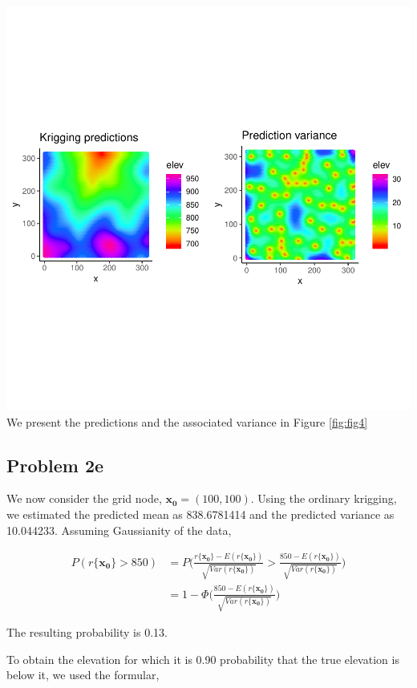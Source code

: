 \documentclass[]{article}
\newcommand{\vect}[1]{\ensuremath{\boldsymbol{\mathbf{#1}}}}
\begin{document}
\includegraphics{Exercise_1_files/figure-latex/fig4-1.pdf} We present
the predictions and the associated variance in Figure \ref{fig:fig4}

\subsection{Problem 2e}\label{problem-2e}

We now consider the grid node, \(\vect{x_0} = (100,100)\). Using the
ordinary krigging, we estimated the predicted mean as 838.6781414 and
the predicted variance as 10.044233. Assuming Gaussianity of the data,

\begin{equation*}
    \begin{split}
P(r\{\vect{x_0}\} > 850) &=P\bigg( \frac{r\{\vect{x_0}\}- E(r\{\vect{x_0}\})}{\sqrt{Var(r\{\vect{x_0}\})}}> \frac{850- E(r\{\vect{x_0}\})}{\sqrt{Var(r\{\vect{x_0}\})}} \bigg)\\
&= 1 - \Phi\bigg(\frac{850- E(r\{\vect{x_0}\})}{\sqrt{Var(r\{\vect{x_0}\})}} \bigg)
  \end{split}
\end{equation*}

The resulting probability is 0.13.

To obtain the elevation for which it is 0.90 probability that the true
elevation is below it, we used the formular,
\end{document}
